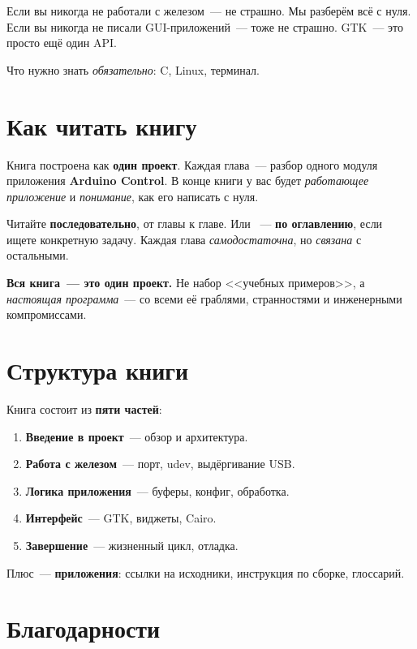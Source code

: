 Если вы никогда не работали с железом~--- не страшно.
Мы разберём всё с нуля. Если вы никогда не писали
GUI-приложений~--- тоже не страшно. GTK~--- это просто ещё
один API.

Что нужно знать \emph{обязательно}: C, Linux, терминал.

\section*{Как читать книгу}

Книга построена как \textbf{один проект}. Каждая глава~---
разбор одного модуля приложения \textbf{Arduino Control}.
В конце книги у вас будет \emph{работающее приложение} и
\emph{понимание}, как его написать с нуля.

Читайте \textbf{последовательно}, от главы к главе. Или~
--- \textbf{по оглавлению}, если ищете конкретную задачу.
Каждая глава \emph{самодостаточна}, но \emph{связана}
с остальными.

\begin{ideabox}
\textbf{Вся книга~--- это один проект.} Не набор
<<учебных примеров>>, а \emph{настоящая программа}~---
со всеми её граблями, странностями и инженерными
компромиссами.
\end{ideabox}

\section*{Структура книги}

Книга состоит из \textbf{пяти частей}:

\begin{enumerate}
    \item \textbf{Введение в проект}~--- обзор и архитектура.
    \item \textbf{Работа с железом}~--- порт, udev, выдёргивание USB.
    \item \textbf{Логика приложения}~--- буферы, конфиг, обработка.
    \item \textbf{Интерфейс}~--- GTK, виджеты, Cairo.
    \item \textbf{Завершение}~--- жизненный цикл, отладка.
\end{enumerate}

Плюс~--- \textbf{приложения}: ссылки на исходники, инструкция
по сборке, глоссарий.

\section*{Благодарности}

